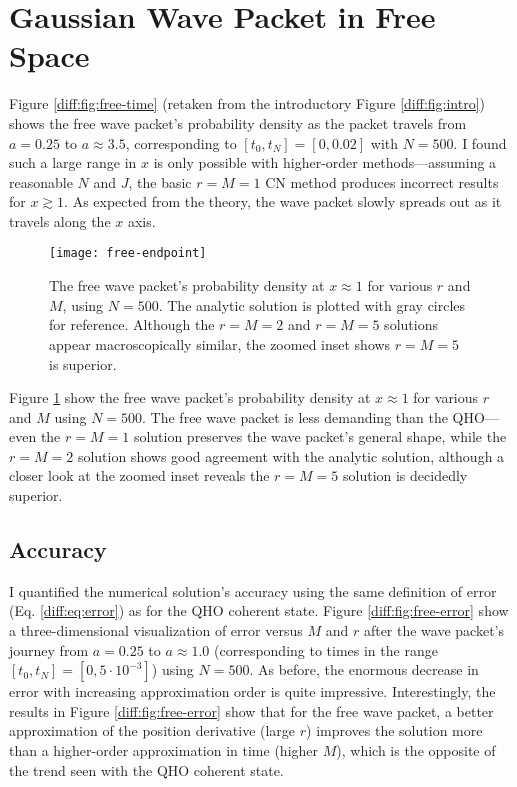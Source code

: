 \documentclass[11pt, a4paper]{article}
\begin{document}
\section{Gaussian Wave Packet in Free Space}
Figure \ref{diff:fig:free-time} (retaken from the introductory Figure \ref{diff:fig:intro}) shows the free wave packet's probability density as the packet travels from $ a = 0.25 $ to $ a \approx 3.5 $, corresponding to $ [t_{0}, t_{N}] = [0, 0.02] $ with $ N = 500 $. I found such a large range in $ x $ is only possible with higher-order methods---assuming a reasonable $ N $ and $ J $, the basic $ r = M = 1 $ CN method produces incorrect results for $ x \gtrsim 1 $. As expected from the theory, the wave packet slowly spreads out as it travels along the $ x $ axis.

\begin{figure}[htb!]
\centering
\texttt{[image: free-endpoint]}
\caption{The free wave packet's probability density at $ x \approx 1 $ for various $ r $ and $ M $, using $ N = 500 $. The analytic solution is plotted with gray circles for reference. Although the $ r = M = 2 $ and $ r = M = 5 $ solutions appear macroscopically similar, the zoomed inset shows $ r = M = 5 $ is superior.}
\label{diff:fig:free-endpoint}
\end{figure}


Figure \ref{diff:fig:free-endpoint} show the free wave packet's probability density at $ x \approx 1 $ for various $ r $ and $ M $ using $ N = 500 $. The free wave packet is less demanding than the QHO---even the $ r = M = 1 $ solution preserves the wave packet's general shape, while the $ r = M = 2 $ solution shows good agreement with the analytic solution, although a closer look at the zoomed inset reveals the $ r = M = 5 $ solution is decidedly superior. 


\subsection{Accuracy}
I quantified the numerical solution's accuracy using the same definition of error (Eq. \ref{diff:eq:error}) as for the QHO coherent state. Figure \ref{diff:fig:free-error} show a three-dimensional visualization of error versus $ M $ and $ r $ after the wave packet's journey from $ a = 0.25 $ to $ a \approx 1.0 $ (corresponding to times in the range $ [t_{0}, t_{N}] = [0, 5\cdot 10^{-3}] $) using $ N = 500 $. As before, the enormous decrease in error with increasing approximation order is quite impressive. Interestingly, the results in Figure \ref{diff:fig:free-error} show that for the free wave packet, a better approximation of the position derivative (large $ r $) improves the solution more than a higher-order approximation in time (higher $ M $), which is the opposite of the trend seen with the QHO coherent state.
\end{document}
